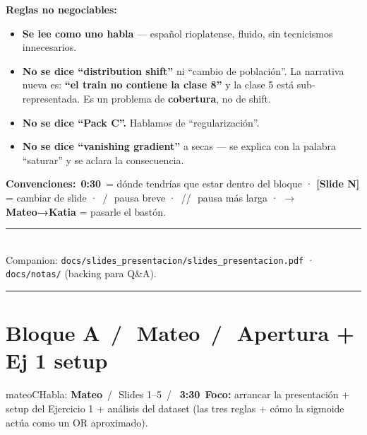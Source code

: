 \documentclass[11pt,a4paper]{article}
\newcommand{\file}[1]{\texttt{\small #1}}
\newcommand{\slidenum}[1]{\textcolor{accent}{\textbf{[Slide #1]}}}
\newcommand{\timing}[1]{\textcolor{muted}{\textbf{\,#1\,}}}
\newcommand{\pausa}{\textcolor{muted}{\,/\,}}
\newcommand{\Pausa}{\textcolor{muted}{\,/\!/\,}}
\newcommand{\paso}[1]{\textcolor{accent}{\textbf{$\to$ #1}}}
\begin{document}
\begin{titlepage}
\begin{flushleft}
\medskip
\textbf{Reglas no negociables:}\\[0.4em]
\begin{tip}
\begin{itemize}[leftmargin=1.4em, itemsep=2pt, topsep=2pt]
  \item \textbf{Se lee como uno habla} --- español rioplatense, fluido, sin tecnicismos innecesarios.
  \item \textbf{No se dice ``distribution shift''} ni ``cambio de población''. La narrativa nueva es: \textbf{``el train no contiene la clase 8''} y la clase 5 está sub-representada. Es un problema de \textbf{cobertura}, no de shift.
  \item \textbf{No se dice ``Pack C''.} Hablamos de ``regularización''.
  \item \textbf{No se dice ``vanishing gradient''} a secas — se explica con la palabra ``saturar'' y se aclara la consecuencia.
\end{itemize}
\end{tip}

\vspace{0.6em}
\textbf{Convenciones:} \timing{0:30} = dónde tendrías que estar dentro del bloque · \slidenum{N} = cambiar de slide · \pausa\ pausa breve · \Pausa\ pausa más larga · \paso{Mateo→Katia} = pasarle el bastón.
\end{flushleft}

\vfill
\begin{flushleft}
\rule{\linewidth}{0.4pt}\\[0.4em]
\textcolor{muted}{\small Companion: \file{docs/slides\_presentacion/slides\_presentacion.pdf} · \file{docs/notas/} (backing para Q\&A).}
\end{flushleft}
\end{titlepage}

\tableofcontents
\bigskip\hrule\bigskip

\section{Bloque A \pausa\ \textcolor{mateoC}{Mateo} \pausa\ Apertura + Ej 1 setup}\label{sec:bloqueA}

\begin{personabox}{mateoC}{Habla: \textcolor{mateoC}{\textbf{Mateo}} \pausa\ Slides 1--5 \pausa\ \timing{3:30}}
\textbf{Foco:} arrancar la presentación + setup del Ejercicio 1 + análisis del dataset (las tres reglas + cómo la sigmoide actúa como un OR aproximado).
\end{personabox}
\end{document}

